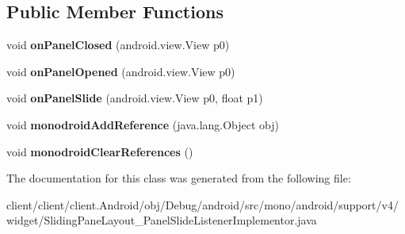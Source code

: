 \subsection*{Public Member Functions}
\begin{DoxyCompactItemize}
\item 
\hypertarget{classmono_1_1android_1_1support_1_1v4_1_1widget_1_1SlidingPaneLayout__PanelSlideListenerImplementor_ac67d9d5a90774b5efb156d8847f9688b}{}void {\bfseries on\+Panel\+Closed} (android.\+view.\+View p0)\label{classmono_1_1android_1_1support_1_1v4_1_1widget_1_1SlidingPaneLayout__PanelSlideListenerImplementor_ac67d9d5a90774b5efb156d8847f9688b}

\item 
\hypertarget{classmono_1_1android_1_1support_1_1v4_1_1widget_1_1SlidingPaneLayout__PanelSlideListenerImplementor_a1ad453041f4b5cc0b2d3fc3b3cbe5877}{}void {\bfseries on\+Panel\+Opened} (android.\+view.\+View p0)\label{classmono_1_1android_1_1support_1_1v4_1_1widget_1_1SlidingPaneLayout__PanelSlideListenerImplementor_a1ad453041f4b5cc0b2d3fc3b3cbe5877}

\item 
\hypertarget{classmono_1_1android_1_1support_1_1v4_1_1widget_1_1SlidingPaneLayout__PanelSlideListenerImplementor_ad81fc29a48a7c9f5d5ae39c3eb014113}{}void {\bfseries on\+Panel\+Slide} (android.\+view.\+View p0, float p1)\label{classmono_1_1android_1_1support_1_1v4_1_1widget_1_1SlidingPaneLayout__PanelSlideListenerImplementor_ad81fc29a48a7c9f5d5ae39c3eb014113}

\item 
\hypertarget{classmono_1_1android_1_1support_1_1v4_1_1widget_1_1SlidingPaneLayout__PanelSlideListenerImplementor_a795110192f8a7aea8421ef11b0b38ce1}{}void {\bfseries monodroid\+Add\+Reference} (java.\+lang.\+Object obj)\label{classmono_1_1android_1_1support_1_1v4_1_1widget_1_1SlidingPaneLayout__PanelSlideListenerImplementor_a795110192f8a7aea8421ef11b0b38ce1}

\item 
\hypertarget{classmono_1_1android_1_1support_1_1v4_1_1widget_1_1SlidingPaneLayout__PanelSlideListenerImplementor_a21c4ba3dde4c1cad8f802c89642934da}{}void {\bfseries monodroid\+Clear\+References} ()\label{classmono_1_1android_1_1support_1_1v4_1_1widget_1_1SlidingPaneLayout__PanelSlideListenerImplementor_a21c4ba3dde4c1cad8f802c89642934da}

\end{DoxyCompactItemize}


The documentation for this class was generated from the following file\+:\begin{DoxyCompactItemize}
\item 
client/client/client.\+Android/obj/\+Debug/android/src/mono/android/support/v4/widget/Sliding\+Pane\+Layout\+\_\+\+Panel\+Slide\+Listener\+Implementor.\+java\end{DoxyCompactItemize}
